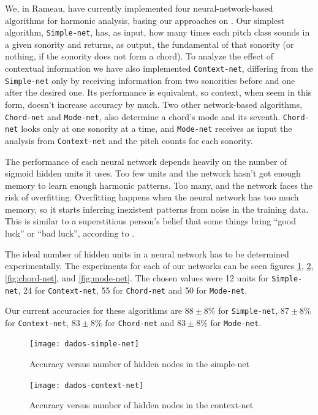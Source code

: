\documentclass{article}
\begin{document}
We, in Rameau, have currently implemented four neural-network-based
algorithms for harmonic analysis, basing our approaches on
\cite{tsui02:_harmon_analy_using_neural_networ}. Our simplest
algorithm, \texttt{Simple-net}, has, as input, how many times each
pitch class sounds in a given sonority and returns, as output, the
fundamental of that sonority (or nothing, if the sonority does not
form a chord). To analyze the effect of contextual information we have
also implemented \texttt{Context-net}, differing from the
\texttt{Simple-net} only by receiving information from two sonorities
before and one after the desired one. Its performance is equivalent,
so context, when seem in this form, doesn't increase accuracy by
much. Two other network-based algorithms, \texttt{Chord-net} and
\texttt{Mode-net}, also determine a chord's mode and its
seventh. \texttt{Chord-net} looks only at one sonority at a time, and
\texttt{Mode-net} receives as input the analysis from
\texttt{Context-net} and the pitch counts for each sonority.

The performance of each neural network depends heavily on the number
of sigmoid hidden units it uses. Too few units and the network hasn't
got enough memory to learn enough harmonic patterns. Too many, and the
network faces the risk of overfitting. Overfitting happens when the
neural network has too much memory, so it starts inferring inexistent
patterns from noise in the training data. This is similar to a
superstitious person's belief that some things bring ``good luck'' or
``bad luck'', according to \cite{white95:superstitious}.

The ideal number of hidden units in a neural network has to be
determined experimentally. The experiments for each of our networks
can be seen figures \ref{fig:simple-net}, \ref{fig:context-net},
\ref{fig:chord-net}, and \ref{fig:mode-net}. The chosen values were 12
units for \texttt{Simple-net}, 24 for \texttt{Context-net}, 55 for
\texttt{Chord-net} and 50 for \texttt{Mode-net}.

Our current accuracies for these algorithms are $88\pm 8\%$ for
\texttt{Simple-net}, $87 \pm 8\%$ for \texttt{Context-net}, $83 \pm
8\%$ for \texttt{Chord-net} and $83 \pm 8\%$ for \texttt{Mode-net}.

\begin{figure}
  \texttt{[image: dados-simple-net]}
  \caption{Accuracy versus number of hidden nodes in the simple-net}
  \label{fig:simple-net}
\end{figure}

\begin{figure}
  \texttt{[image: dados-context-net]}
  \caption{Accuracy versus number of hidden nodes in the context-net}
  \label{fig:context-net}
\end{figure}
\end{document}

